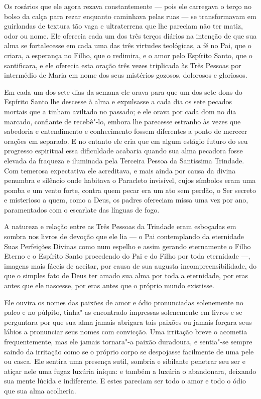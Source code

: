Os rosários que ele agora rezava constantemente --- pois ele carregava o
terço no bolso da calça para rezar enquanto caminhava pelas ruas --- se
transformavam em guirlandas de textura tão vaga e ultraterrena que lhe
pareciam não ter matiz, odor ou nome. Ele oferecia cada um dos três
terços diários na intenção de que sua alma se fortalecesse em cada uma
das três virtudes teológicas, a fé no Pai, que o criara, a esperança no
Filho, que o redimira, e o amor pelo Espírito Santo, que o santificara,
e ele oferecia esta oração três vezes triplicada às Três Pessoas por
intermédio de Maria em nome dos seus mistérios gozosos, dolorosos e
gloriosos.

Em cada um dos sete dias da semana ele orava para que um dos sete dons
do Espírito Santo lhe descesse à alma e expulsasse a cada dia os sete
pecados mortais que a tinham aviltado no passado; e ele orava por cada
dom no dia marcado, confiante de recebê"-lo, embora lhe parecesse
estranho às vezes que sabedoria e entendimento e conhecimento fossem
diferentes a ponto de merecer orações em separado. E no entanto ele
cria que em algum estágio futuro do seu progresso espiritual essa
dificuldade acabaria quando sua alma pecadora fosse elevada da fraqueza
e iluminada pela Terceira Pessoa da Santíssima Trindade. Com temerosa
expectativa ele acreditava, e mais ainda por causa da divina penumbra e
silêncio onde habitava o Paracleto invisível, cujos símbolos eram uma
pomba e um vento forte, contra quem pecar era um ato sem perdão, o Ser
secreto e misterioso a quem, como a Deus, os padres ofereciam missa uma
vez por ano, paramentados com o escarlate das línguas de fogo.

A natureza e relação entre as Três Pessoas da Trindade eram esboçadas em
sombra nos livros de devoção que ele lia --- o Pai contemplando da
eternidade Suas Perfeições Divinas como num espelho e assim gerando
eternamente o Filho Eterno e o Espírito Santo procedendo do Pai e do
Filho por toda eternidade ---, imagens mais fáceis de aceitar, por causa
de sua augusta incompreensibilidade, do que o simples fato de Deus ter
amado sua alma por toda a eternidade, por eras antes que ele nascesse,
por eras antes que o próprio mundo existisse.

Ele ouvira os nomes das paixões de amor e ódio pronunciadas solenemente
no palco e no púlpito, tinha"-as encontrado impressas solenemente em
livros e se perguntara por que sua alma jamais abrigara tais paixões ou
jamais forçara seus lábios a pronunciar seus nomes com convicção. Uma
irritação breve o acometia frequentemente, mas ele jamais tornara"-a
paixão duradoura, e sentia"-se sempre saindo da irritação como se o
próprio corpo se despojasse facilmente de uma pele ou casca. Ele
sentira uma presença sutil, sombria e sibilante penetrar seu ser e
atiçar nele uma fugaz luxúria iníqua: e também a luxúria o abandonara,
deixando sua mente lúcida e indiferente. E estes pareciam ser todo o
amor e todo o ódio que sua alma acolheria.

